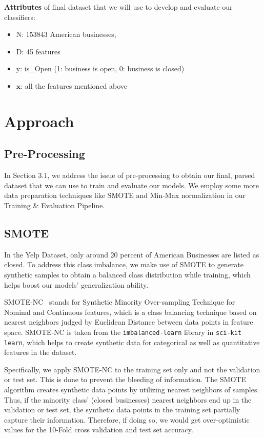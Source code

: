 \documentclass{article}
\begin{document}
\textbf{Attributes} of final dataset that we will use to develop and evaluate our classifiers:

\begin{itemize}
    \item $\text{N}$: 153843 American businesses, 
 \item $\text{D}$: 45 features
 \item $\text{y}$: is\_Open (1: business is open, 0: business is closed)
 \item $\mathbf{x}$: all the features mentioned above
\end{itemize}




\section{Approach}

\subsection{Pre-Processing}

In Section 3.1, we address the issue of pre-processing to obtain our final, parsed dataset that we can use to train and evaluate our models. We employ some more data preparation techniques like SMOTE and Min-Max normalization in our Training \& Evaluation Pipeline.




\subsection{SMOTE}

In the Yelp Dataset, only around 20 percent of American Businesses are listed as closed. To address this class imbalance, we make use of SMOTE to generate synthetic samples to obtain a balanced class distribution while training, which helps boost our models' generalization ability. 

SMOTE-NC~\cite{chawla2002smote} stands for Synthetic Minority Over-sampling Technique for Nominal and Continuous features, which  is a class balancing technique based on nearest neighbors judged by Euclidean Distance between data points in feature space. SMOTE-NC is taken from the \texttt{imbalanced-learn} library in \texttt{sci-kit learn}, which helps to create synthetic data for categorical as well as quantitative features in the dataset.

Specifically, we apply SMOTE-NC to the training set only and not the validation or test set. This is done to prevent the bleeding of information. The SMOTE algorithm creates synthetic data points by utilizing nearest neighbors of samples. Thus, if the minority class' (closed businesses) nearest neighbors end up in the validation or test set, the synthetic data points in the training set partially capture their information. Therefore, if doing so, we would get over-optimistic values for the 10-Fold cross validation and test set accuracy.  
\end{document}
